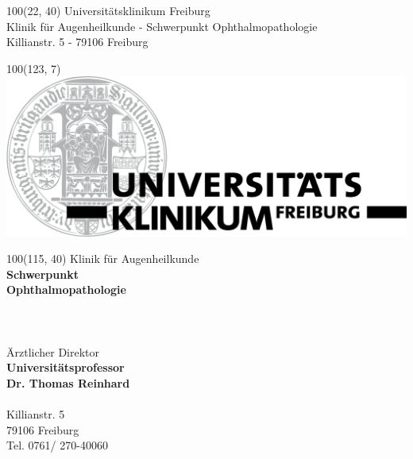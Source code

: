 \documentclass[12pt]{g-brief}
\begin{document}
\baselineskip10pt

\textblockorigin{0in}{0in}
\setlength{\TPHorizModule}{1mm}
\setlength{\TPVertModule}{1mm}

{

\begin{textblock}{100}(22, 40) 
\noindent 
\scriptsize
Universitätsklinikum Freiburg\\
\tiny
Klinik für Augenheilkunde - Schwerpunkt Ophthalmopathologie \\ Killianstr. 5 - 79106 Freiburg
\end{textblock}
}


{
\begin{textblock}{100}(123, 7) 
\includegraphics[scale=0.25]{Formuladr.png}
\end{textblock}
}

{
\scriptsize
\begin{textblock}{100}(115, 40) 
Klinik für Augenheilkunde \\
\textbf{Schwerpunkt\\ Ophthalmopathologie}\\\\
\\\\
Ärztlicher Direktor\\
\textbf{Universitätsprofessor\\
Dr. Thomas Reinhard}\\\\
Killianstr. 5\\
79106 Freiburg\\
Tel. 0761/ 270-40060\\
\end{textblock}
}
\end{document}
